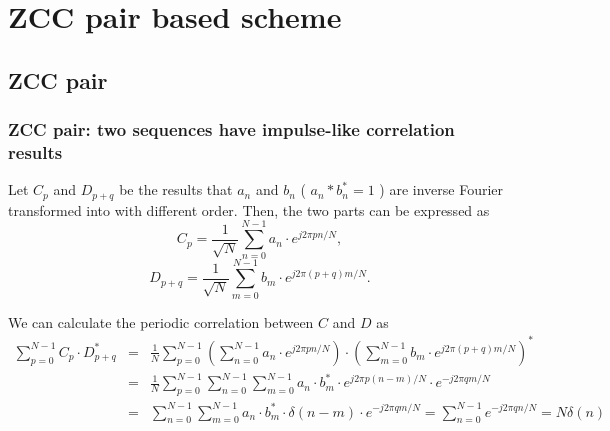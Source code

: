 \documentclass[8 pt]{beamer} %
\begin{document}
\section{ZCC pair based scheme}
\subsection{ZCC pair}
\begin{frame}
\frametitle{ZCC pair: two sequences have impulse-like correlation results}
Let $C_p$ and $D_{p+q}$ be the results that $a_n$ and $b_n$ ( $a_n*b_n^*=1$ ) are inverse Fourier transformed into with different order. Then, the two parts can be expressed as
\begin{equation}
        C_p=\frac{1}{\sqrt{N}}\sum_{n=0}^{N-1} a_n\cdot e^{j2\pi pn/N},
\end{equation}
\begin{equation}
        D_{p+q}=\frac{1}{\sqrt{N}}\sum_{m=0}^{N-1} b_m\cdot e^{j2\pi (p+q)m/N}.
\end{equation}

We can calculate the periodic correlation between $C$ and $D$ as
    \begin{eqnarray}
         \sum_{p=0}^{N-1} C_p\cdot D_{p+q}^* 
        &=& \frac{1}{N}\sum_{p=0}^{N-1} (\sum_{n=0}^{N-1} a_n\cdot e^{j2\pi pn/N})\cdot (\sum_{m=0}^{N-1} b_m\cdot e^{j2\pi (p+q)m/N})^* \nonumber \\
        &=& \frac{1}{N}\sum_{p=0}^{N-1}\sum_{n=0}^{N-1}\sum_{m=0}^{N-1} a_n\cdot b_m^*\cdot e^{j2\pi p(n-m)/N}\cdot e^{-j2\pi qm/N} \nonumber \\
        &=& \sum_{n=0}^{N-1}\sum_{m=0}^{N-1} a_n\cdot b_m^*\cdot \delta(n-m)\cdot e^{-j2\pi qm/N}
        = \sum_{n=0}^{N-1} e^{-j2\pi qn/N} = N \delta(n)
    \end{eqnarray}

\end{frame}
\end{document}
